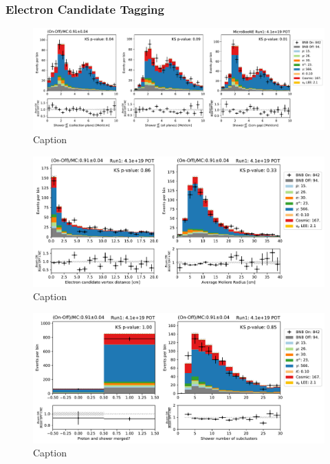 \subsubsection{Electron Candidate Tagging}

\begin{figure}
    \centering
    \includegraphics[width=\textwidth]{NueCCsel/Images/run1/e_cand_dedx.pdf}
    \caption{Caption}
    \label{fig:e_cand_dedx}
\end{figure}

\begin{figure}
    \centering
    \includegraphics[width=\textwidth]{NueCCsel/Images/run1/e_cand_dist.pdf}
    \caption{Caption}
    \label{fig:e_cand_dist}
\end{figure}

\begin{figure}
    \centering
    \includegraphics[width=\textwidth]{NueCCsel/Images/run1/e_cand_subclusters.pdf}
    \caption{Caption}
    \label{fig:e_cand_subclusters}
\end{figure}

